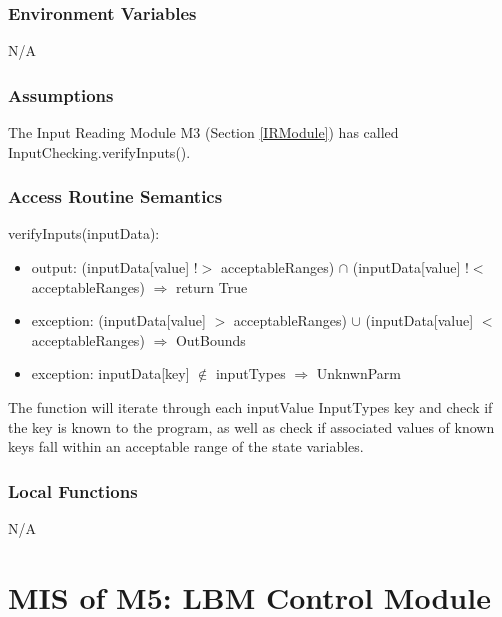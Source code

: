 \documentclass[12pt, titlepage]{article}
\begin{document}
\subsubsection{Environment Variables}
N/A

\subsubsection{Assumptions}

The Input Reading Module M3 (Section \ref{IRModule}) has called
InputChecking.verifyInputs().  

\subsubsection{Access Routine Semantics}

\noindent verifyInputs(inputData):
\begin{itemize}
	\item output: (inputData[value] $!>$ acceptableRanges) $\cap$ (inputData[value] $!<$ acceptableRanges) $\Rightarrow$ return True
	\item exception: (inputData[value] $>$ acceptableRanges) $\cup$ (inputData[value] $<$ acceptableRanges) $\Rightarrow$ OutBounds
	\item exception: inputData[key] $\notin$ inputTypes $\Rightarrow$ UnknwnParm
\end{itemize} 

The function will iterate through each inputValue InputTypes key and check if
the key is known to the program, as well as check if associated values of known
keys fall within an acceptable range of the state variables.

\subsubsection{Local Functions}

N/A

\newpage

\section{MIS of M5: LBM Control Module} \label{LCModule}
\end{document}
